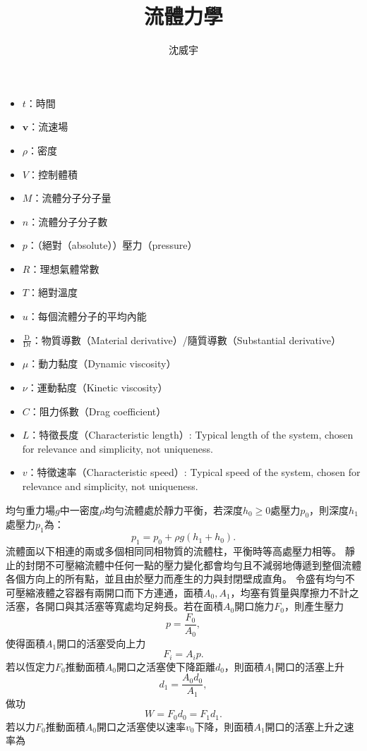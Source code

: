 \documentclass[a4paper,12pt]{article}
\begin{document}
\title{流體力學}
\author{沈威宇}
\date{\temtoday}
\titletocdoc
{}
\begin{itemize}
\item $t$：時間
\item $\mathbf{v}$：流速場
\item $\rho$：密度
\item $V$：控制體積
\item $M$：流體分子分子量
\item $n$：流體分子分子數
\item $p$：（絕對（absolute））壓力（pressure）
\item $R$：理想氣體常數
\item $T$：絕對溫度
\item $u$：每個流體分子的平均內能
\item $\frac{\mathrm{D}}{\mathrm{D}t}$：物質導數（Material derivative）/隨質導數（Substantial derivative）
\item $\mu$：動力黏度（Dynamic viscosity）
\item $\nu$：運動黏度（Kinetic viscosity）
\item $C$：阻力係數（Drag coefficient）
\item $L$：特徵長度（Characteristic length）: Typical length of the system, chosen for relevance and simplicity, not uniqueness.
\item $v$：特徵速率（Characteristic speed）: Typical speed of the system, chosen for relevance and simplicity, not uniqueness.
\end{itemize}
均勻重力場$g$中一密度$\rho$均勻流體處於靜力平衡，若深度$h_0\geq 0$處壓力$p_0$，則深度$h_1$處壓力$p_1$為：
\[p_1=p_0+\rho g(h_1+h_0).\]
流體面以下相連的兩或多個相同同相物質的流體柱，平衡時等高處壓力相等。
靜止的封閉不可壓縮流體中任何一點的壓力變化都會均勻且不減弱地傳遞到整個流體各個方向上的所有點，並且由於壓力而產生的力與封閉壁成直角。
令盛有均勻不可壓縮液體之容器有兩開口而下方連通，面積$A_0,A_1$，均塞有質量與摩擦力不計之活塞，各開口與其活塞等寬處均足夠長。若在面積$A_0$開口施力$F_0$，則產生壓力
\[p=\frac{F_0}{A_0},\]
使得面積$A_1$開口的活塞受向上力
\[F_i=A_ip.\]
若以恆定力$F_0$推動面積$A_0$開口之活塞使下降距離$d_0$，則面積$A_1$開口的活塞上升
\[d_1=\frac{A_0d_0}{A_1},\]
做功
\[W=F_0d_0=F_1d_1.\]
若以力$F_0$推動面積$A_0$開口之活塞使以速率$v_0$下降，則面積$A_1$開口的活塞上升之速率為
\end{document}
